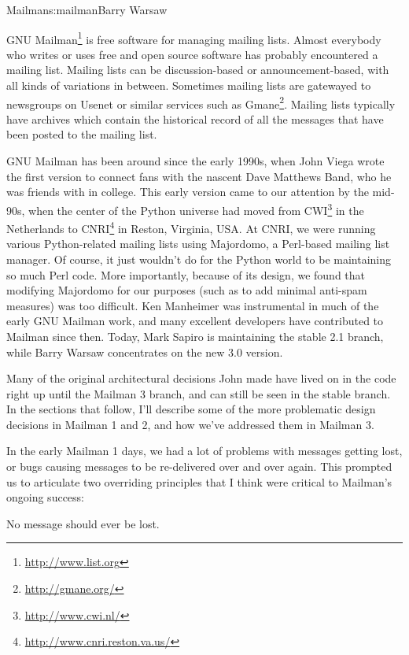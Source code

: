 \begin{aosachapter}{Mailman}{s:mailman}{Barry Warsaw}

GNU Mailman\footnote{\url{http://www.list.org}} is free software for
managing mailing lists.  Almost everybody who writes or uses free and
open source software has probably encountered a mailing list.  Mailing
lists can be discussion-based or announcement-based, with all kinds of
variations in between.  Sometimes mailing lists are gatewayed to
newsgroups on Usenet or similar services such as
Gmane\footnote{\url{http://gmane.org/}}.  Mailing lists typically have
archives which contain the historical record of all the messages that
have been posted to the mailing list.

GNU Mailman has been around since the early 1990s, when John Viega
wrote the first version to connect fans with the nascent Dave Matthews
Band, who he was friends with in college.  This early version came to
our attention by the mid-90s, when the center of the Python universe
had moved from CWI\footnote{\url{http://www.cwi.nl/}} in the
Netherlands to CNRI\footnote{\url{http://www.cnri.reston.va.us/}} in
Reston, Virginia, USA.  At CNRI, we were running various
Python-related mailing lists using Majordomo, a Perl-based mailing
list manager.  Of course, it just wouldn't do for the Python world to
be maintaining so much Perl code.  More importantly, because of its
design, we found that modifying Majordomo for our purposes (such as to
add minimal anti-spam measures) was too difficult.  Ken Manheimer was
instrumental in much of the early GNU Mailman work, and many excellent
developers have contributed to Mailman since then.  Today, Mark Sapiro
is maintaining the stable 2.1 branch, while Barry Warsaw concentrates
on the new 3.0 version.

Many of the original architectural decisions John made have lived on
in the code right up until the Mailman 3 branch, and can still be seen
in the stable branch.  In the sections that follow, I'll describe some
of the more problematic design decisions in Mailman 1 and 2, and how
we've addressed them in Mailman 3.

In the early Mailman 1 days, we had a lot of problems with messages
getting lost, or bugs causing messages to be re-delivered over and
over again.  This prompted us to articulate two overriding principles
that I think were critical to Mailman's ongoing success:

\begin{aosaitemize}

\item No message should ever be lost.


\end{aosaitemize}
\end{aosachapter}
